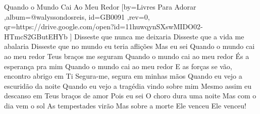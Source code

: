 \beginsong
{Quando o Mundo Cai Ao Meu Redor %
}[by={Livres Para Adorar %
},album={@walyssondosreis},
id={GB0091 %
},rev={0}, %
qr={https://drive.google.com/open?id=11huwqynSXswMIDO02-HTmcS2GButEHYb %
}]
\beginverse*
Disseste que nunca me deixaria
Disseste que a vida me abalaria
Disseste que no mundo eu teria aflições
Mas eu sei
\endverse
\beginchorus
Quando o mundo cai ao meu redor
Teus braços me seguram
Quando o mundo cai ao meu redor
És a esperança pra mim
Quando o mundo cai ao meu redor
E as forças se vão, encontro abrigo em Ti
Segura-me, segura em minhas mãos
\endchorus
\beginverse*
Quando eu vejo a escuridão da noite
Quando eu vejo a tragédia vindo sobre mim
Mesmo assim eu descanso em Teus braços de amor
Pois eu sei
\endverse
\beginverse*
O choro dura uma noite
Mas com o dia vem o sol
As tempestades virão
Mas sobre a morte Ele venceu
Ele venceu!
\endverse
\vspace{4em} %
\begin{comment}
\lstset{basicstyle=\scriptsize\bf} %
\tab{Solo 1}
\begin{lstlisting}
E|-----------------------------------------------------|
B|-----------------------------------------------------|
G|-----------------------------------------------------|
D|-----------------------------------------------------|
A|-----------------------------------------------------|
E|-----------------------------------------------------|
\end{lstlisting}
\end{comment}
 
